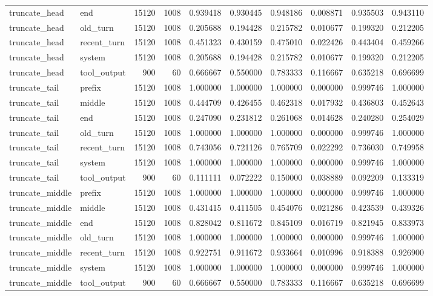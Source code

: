 \begin{tabular}{llrrrrrrrr}
truncate_head & end & 15120 & 1008 & 0.939418 & 0.930445 & 0.948186 & 0.008871 & 0.935503 & 0.943110 \\
truncate_head & old_turn & 15120 & 1008 & 0.205688 & 0.194428 & 0.215782 & 0.010677 & 0.199320 & 0.212205 \\
truncate_head & recent_turn & 15120 & 1008 & 0.451323 & 0.430159 & 0.475010 & 0.022426 & 0.443404 & 0.459266 \\
truncate_head & system & 15120 & 1008 & 0.205688 & 0.194428 & 0.215782 & 0.010677 & 0.199320 & 0.212205 \\
truncate_head & tool_output & 900 & 60 & 0.666667 & 0.550000 & 0.783333 & 0.116667 & 0.635218 & 0.696699 \\
truncate_tail & prefix & 15120 & 1008 & 1.000000 & 1.000000 & 1.000000 & 0.000000 & 0.999746 & 1.000000 \\
truncate_tail & middle & 15120 & 1008 & 0.444709 & 0.426455 & 0.462318 & 0.017932 & 0.436803 & 0.452643 \\
truncate_tail & end & 15120 & 1008 & 0.247090 & 0.231812 & 0.261068 & 0.014628 & 0.240280 & 0.254029 \\
truncate_tail & old_turn & 15120 & 1008 & 1.000000 & 1.000000 & 1.000000 & 0.000000 & 0.999746 & 1.000000 \\
truncate_tail & recent_turn & 15120 & 1008 & 0.743056 & 0.721126 & 0.765709 & 0.022292 & 0.736030 & 0.749958 \\
truncate_tail & system & 15120 & 1008 & 1.000000 & 1.000000 & 1.000000 & 0.000000 & 0.999746 & 1.000000 \\
truncate_tail & tool_output & 900 & 60 & 0.111111 & 0.072222 & 0.150000 & 0.038889 & 0.092209 & 0.133319 \\
truncate_middle & prefix & 15120 & 1008 & 1.000000 & 1.000000 & 1.000000 & 0.000000 & 0.999746 & 1.000000 \\
truncate_middle & middle & 15120 & 1008 & 0.431415 & 0.411505 & 0.454076 & 0.021286 & 0.423539 & 0.439326 \\
truncate_middle & end & 15120 & 1008 & 0.828042 & 0.811672 & 0.845109 & 0.016719 & 0.821945 & 0.833973 \\
truncate_middle & old_turn & 15120 & 1008 & 1.000000 & 1.000000 & 1.000000 & 0.000000 & 0.999746 & 1.000000 \\
truncate_middle & recent_turn & 15120 & 1008 & 0.922751 & 0.911672 & 0.933664 & 0.010996 & 0.918388 & 0.926900 \\
truncate_middle & system & 15120 & 1008 & 1.000000 & 1.000000 & 1.000000 & 0.000000 & 0.999746 & 1.000000 \\
truncate_middle & tool_output & 900 & 60 & 0.666667 & 0.550000 & 0.783333 & 0.116667 & 0.635218 & 0.696699 \\
\bottomrule
\end{tabular}
